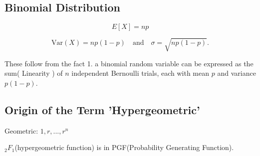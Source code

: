 


\subsection*{Binomial Distribution}
\[
E[X] = np
\]

\[
\mathrm{Var}(X) = np(1-p)
\quad\text{and}\quad
\sigma = \sqrt{np(1-p)}.
\]


These follow from the fact
1. a binomial random variable can be expressed as the sum( Linearity ) of $n$ independent Bernoulli trials, each with mean $p$ and variance $p(1-p)$.

\subsection*{Origin of the Term 'Hypergeometric'}

Geometric: $1, r, ..., r^n$

${}_2F_1$(hypergeometric function) is in PGF(Probability Generating Function).
